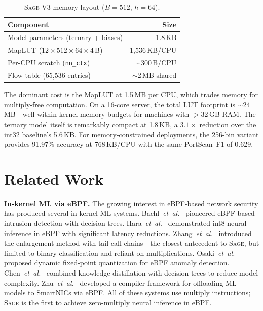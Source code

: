 \documentclass[sigconf,nonacm]{acmart}
\newcommand{\sys}{\textsc{Sage}\xspace}
\newcommand{\etal}{\textit{et~al.}\xspace}
\begin{document}
\begin{table}[t]
\centering
\caption{\sys V3 memory layout ($B = 512$, $h = 64$).}
\label{tab:memory}
\small
\begin{tabular}{lr}
\toprule
Component & Size \\
\midrule
Model parameters (ternary + biases) & 1.8\,KB \\
MapLUT ($12 \times 512 \times 64 \times 4$\,B) & 1{,}536\,KB/CPU \\
Per-CPU scratch (\texttt{nn\_ctx}) & ${\sim}$300\,B/CPU \\
Flow table (65{,}536 entries) & ${\sim}$2\,MB shared \\
\bottomrule
\end{tabular}
\end{table}

The dominant cost is the MapLUT at 1.5\,MB per CPU, which trades memory
for multiply-free computation.
On a 16-core server, the total LUT footprint is ${\sim}$24\,MB---well
within kernel memory budgets for machines with $>$32\,GB RAM.
The ternary model itself is remarkably compact at 1.8\,KB,
a $3.1\times$ reduction over the int32 baseline's 5.6\,KB.
For memory-constrained deployments, the 256-bin variant provides
91.97\% accuracy at 768\,KB/CPU with the same PortScan~F1 of 0.629.


\section{Related Work}\label{sec:related}

\textbf{In-kernel ML via eBPF.}
The growing interest in eBPF-based network security has produced several
in-kernel ML systems.
Bachl~\etal~\cite{bachl2021dt} pioneered eBPF-based intrusion detection
with decision trees.
Hara~\etal~\cite{hara2023nn} demonstrated int8 neural inference in
eBPF with significant latency reductions.
Zhang~\etal~\cite{zhang2024dsn} introduced the enlargement method with
tail-call chains---the closest antecedent to \sys, but limited to binary
classification and reliant on multiplications.
Osaki~\etal~\cite{osaki2024} proposed dynamic fixed-point quantization
for eBPF anomaly detection.
Chen~\etal~\cite{chen2025kd} combined knowledge distillation with
decision trees to reduce model complexity.
Zhu~\etal~\cite{o2c2024} developed a compiler framework for offloading
ML models to SmartNICs via eBPF.
All of these systems use multiply instructions; \sys is the first to
achieve zero-multiply neural inference in eBPF.
\end{document}
